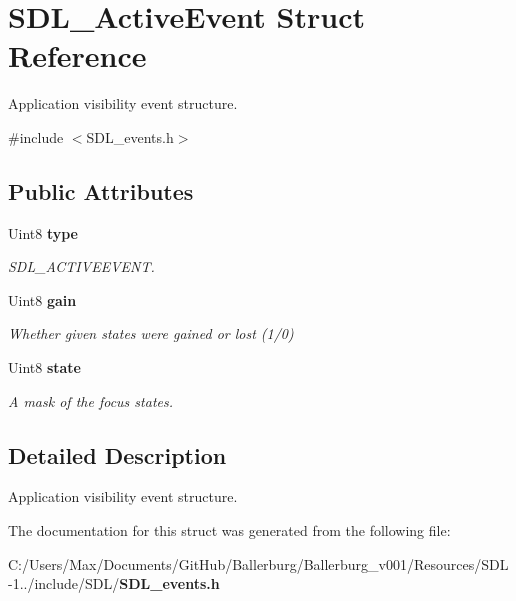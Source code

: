 \section{S\+D\+L\+\_\+\+Active\+Event Struct Reference}
\label{struct_s_d_l___active_event}


Application visibility event structure.  




{\ttfamily \#include $<$S\+D\+L\+\_\+events.\+h$>$}

\subsection*{Public Attributes}
\begin{DoxyCompactItemize}
\item 
Uint8 {\bf type}\label{struct_s_d_l___active_event_a4a719c0224f4c0079043432f540621c4}

\begin{DoxyCompactList}\small\item\em S\+D\+L\+\_\+\+A\+C\+T\+I\+V\+E\+E\+V\+E\+N\+T. \end{DoxyCompactList}\item 
Uint8 {\bf gain}\label{struct_s_d_l___active_event_a4887e4fa212696de9fa8803691dfe5c9}

\begin{DoxyCompactList}\small\item\em Whether given states were gained or lost (1/0) \end{DoxyCompactList}\item 
Uint8 {\bf state}\label{struct_s_d_l___active_event_af8f060502a9c906b25a4aa9c61f745f9}

\begin{DoxyCompactList}\small\item\em A mask of the focus states. \end{DoxyCompactList}\end{DoxyCompactItemize}


\subsection{Detailed Description}
Application visibility event structure. 

The documentation for this struct was generated from the following file\+:\begin{DoxyCompactItemize}
\item 
C\+:/\+Users/\+Max/\+Documents/\+Git\+Hub/\+Ballerburg/\+Ballerburg\+\_\+v001/\+Resources/\+S\+D\+L-\/1../include/\+S\+D\+L/{\bf S\+D\+L\+\_\+events.\+h}\end{DoxyCompactItemize}
